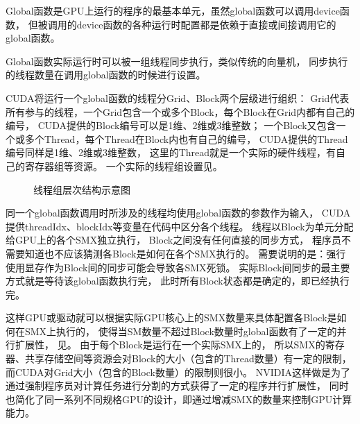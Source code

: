 Global函数是GPU上运行的程序的最基本单元，虽然global函数可以调用device函数，
但被调用的device函数的各种运行时配置都是依赖于直接或间接调用它的global函数。

Global函数实际运行时可以被一组线程同步执行，类似传统的向量机，
同步执行的线程数量在调用global函数的时候进行设置。

CUDA将运行一个global函数的线程分Grid、Block两个层级进行组织：
Grid代表所有参与的线程，一个Grid包含一个或多个Block，每个Block在Grid内都有自己的编号，
CUDA提供的Block编号可以是1维、2维或3维整数；
一个Block又包含一个或多个Thread，每个Thread在Block内也有自己的编号，
CUDA提供的Thread编号同样是1维、2维或3维整数，
这里的Thread就是一个实际的硬件线程，有自己的寄存器组等资源。
一个实际的线程组设置见。

\begin{figure}
\centering
{}
\caption[线程组层次结构示意图]{\label{fig:gpu.cuda.blocks}线程组层次结构示意图
\cite{cudadoc-cprogrammingguide}}
\end{figure}

同一个global函数调用时所涉及的线程均使用global函数的参数作为输入，
CUDA提供threadIdx、blockIdx等变量在代码中区分各个线程。
线程以Block为单元分配给GPU上的各个SMX独立执行，
Block之间没有任何直接的同步方式，
程序员不需要知道也不应该猜测各Block是如何在各个SMX执行的。
需要说明的是：强行使用显存作为Block间的同步可能会导致各SMX死锁。
实际Block间同步的最主要方式就是等待该global函数执行完，
此时所有Block状态都是确定的，即已经执行完。

这样GPU或驱动就可以根据实际GPU核心上的SMX数量来具体配置各Block是如何在SMX上执行的，
使得当SM数量不超过Block数量时global函数有了一定的并行扩展性，
见。
由于每个Block是运行在一个实际SMX上的，
所以SMX的寄存器、共享存储空间等资源会对Block的大小（包含的Thread数量）有一定的限制，
而CUDA对Grid大小（包含的Block数量）的限制则很小。
NVIDIA这样做是为了通过强制程序员对计算任务进行分割的方式获得了一定的程序并行扩展性，
同时也简化了同一系列不同规格GPU的设计，即通过增减SMX的数量来控制GPU计算能力。

